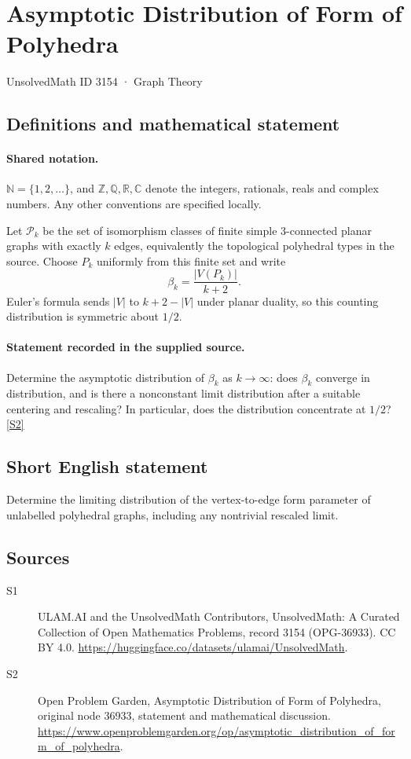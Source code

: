 \documentclass[11pt]{article}
\newcommand{\sref}[2]{\hyperlink{source:#1:#2}{[S#2]}}
\begin{document}
\setcounter{section}{3153}
\section{Asymptotic Distribution of Form of Polyhedra}\label{3154}
{\small\sffamily UnsolvedMath ID 3154 · Graph Theory}
\subsection{Definitions and mathematical statement}

\paragraph{Shared notation.}$\mathbb N=\{1,2,\ldots\}$, and $\mathbb Z,\mathbb Q,\mathbb R,\mathbb C$ denote the integers, rationals, reals and complex numbers. Any other conventions are specified locally.


Let $\mathcal P_k$ be the set of isomorphism classes of finite simple $3$-connected planar graphs with exactly $k$ edges, equivalently the topological polyhedral types in the source. Choose $P_k$ uniformly from this finite set and write \[\beta_k=\frac{|V(P_k)|}{k+2}.\] Euler's formula sends $|V|$ to $k+2-|V|$ under planar duality, so this counting distribution is symmetric about $1/2$.
\paragraph{Statement recorded in the supplied source.}
Determine the asymptotic distribution of $\beta_k$ as $k\to\infty$: does $\beta_k$ converge in distribution, and is there a nonconstant limit distribution after a suitable centering and rescaling? In particular, does the distribution concentrate at $1/2$? \sref{3154}{2}
\subsection{Short English statement}
Determine the limiting distribution of the vertex-to-edge form parameter of unlabelled polyhedral graphs, including any nontrivial rescaled limit.
\subsection{Sources}
\begin{description}
\item[\hypertarget{source:3154:1}{S1}] ULAM.AI and the UnsolvedMath Contributors, UnsolvedMath: A Curated Collection of Open Mathematics Problems, record 3154 (OPG-36933). CC BY 4.0. \url{https://huggingface.co/datasets/ulamai/UnsolvedMath}.
\item[\hypertarget{source:3154:2}{S2}] Open Problem Garden, Asymptotic Distribution of Form of Polyhedra, original node 36933, statement and mathematical discussion. \url{https://www.openproblemgarden.org/op/asymptotic_distribution_of_form_of_polyhedra}.
\end{description}
\label{end:3154}
\end{document}
